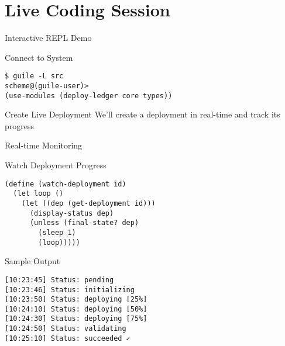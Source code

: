 \documentclass[presentation]{beamer}
\begin{document}
\section{Live Coding Session}
\label{sec:orgb64abd0}
\begin{frame}[label={sec:orgacc6bd5},fragile]{Interactive REPL Demo}
 \begin{block}{Connect to System}
\begin{verbatim}
$ guile -L src
scheme@(guile-user)>
(use-modules (deploy-ledger core types))
\end{verbatim}
\end{block}
\begin{block}{Create Live Deployment}
We'll create a deployment in real-time
and track its progress
\end{block}
\end{frame}
\begin{frame}[label={sec:orgfc03dda},fragile]{Real-time Monitoring}
 \begin{block}{Watch Deployment Progress}
\begin{verbatim}
(define (watch-deployment id)
  (let loop ()
    (let ((dep (get-deployment id)))
      (display-status dep)
      (unless (final-state? dep)
        (sleep 1)
        (loop)))))
\end{verbatim}
\end{block}
\begin{block}{Sample Output}
\begin{verbatim}
[10:23:45] Status: pending
[10:23:46] Status: initializing
[10:23:50] Status: deploying [25%]
[10:24:10] Status: deploying [50%]
[10:24:30] Status: deploying [75%]
[10:24:50] Status: validating
[10:25:10] Status: succeeded ✓
\end{verbatim}
\end{block}
\end{frame}
\end{document}
